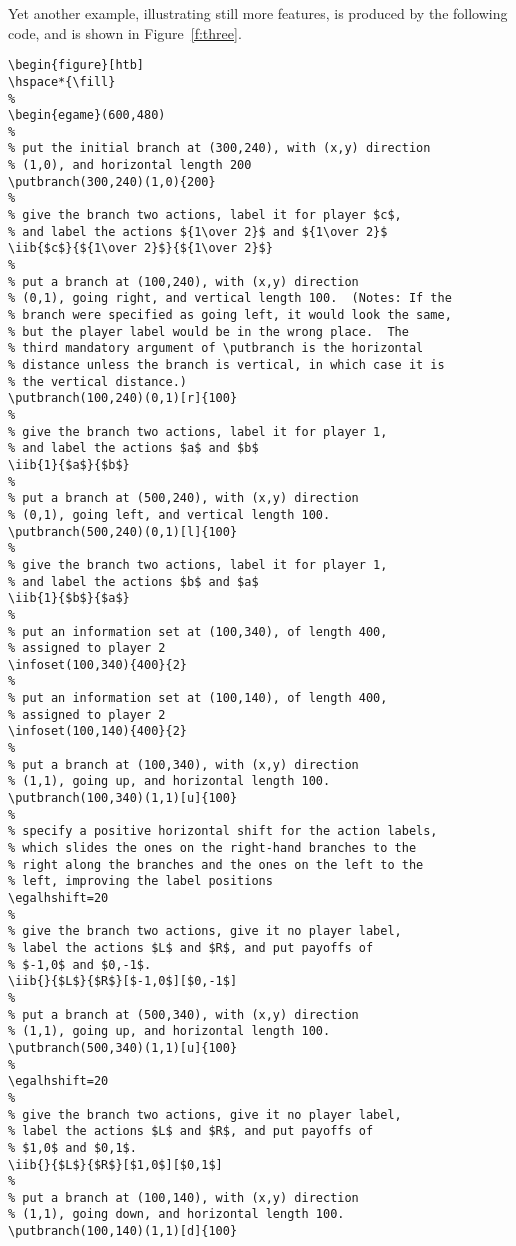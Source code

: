 \documentclass[12pt]{article}
\begin{document}
Yet another example, illustrating still more features, is produced by the
following code, and is shown in Figure~\ref{f:three}.

\begin{verbatim}
\begin{figure}[htb]
\hspace*{\fill}
%
\begin{egame}(600,480)
%
% put the initial branch at (300,240), with (x,y) direction
% (1,0), and horizontal length 200
\putbranch(300,240)(1,0){200}
%
% give the branch two actions, label it for player $c$,
% and label the actions ${1\over 2}$ and ${1\over 2}$
\iib{$c$}{${1\over 2}$}{${1\over 2}$}
%
% put a branch at (100,240), with (x,y) direction
% (0,1), going right, and vertical length 100.  (Notes: If the
% branch were specified as going left, it would look the same,
% but the player label would be in the wrong place.  The
% third mandatory argument of \putbranch is the horizontal
% distance unless the branch is vertical, in which case it is
% the vertical distance.)
\putbranch(100,240)(0,1)[r]{100}
%
% give the branch two actions, label it for player 1,
% and label the actions $a$ and $b$
\iib{1}{$a$}{$b$}
%
% put a branch at (500,240), with (x,y) direction
% (0,1), going left, and vertical length 100.
\putbranch(500,240)(0,1)[l]{100}
%
% give the branch two actions, label it for player 1,
% and label the actions $b$ and $a$
\iib{1}{$b$}{$a$}
%
% put an information set at (100,340), of length 400,
% assigned to player 2
\infoset(100,340){400}{2}
%
% put an information set at (100,140), of length 400,
% assigned to player 2
\infoset(100,140){400}{2}
%
% put a branch at (100,340), with (x,y) direction
% (1,1), going up, and horizontal length 100.
\putbranch(100,340)(1,1)[u]{100}
%
% specify a positive horizontal shift for the action labels,
% which slides the ones on the right-hand branches to the
% right along the branches and the ones on the left to the
% left, improving the label positions
\egalhshift=20
%
% give the branch two actions, give it no player label,
% label the actions $L$ and $R$, and put payoffs of
% $-1,0$ and $0,-1$.
\iib{}{$L$}{$R$}[$-1,0$][$0,-1$]
%
% put a branch at (500,340), with (x,y) direction
% (1,1), going up, and horizontal length 100.
\putbranch(500,340)(1,1)[u]{100}
%
\egalhshift=20
%
% give the branch two actions, give it no player label,
% label the actions $L$ and $R$, and put payoffs of
% $1,0$ and $0,1$.
\iib{}{$L$}{$R$}[$1,0$][$0,1$]
%
% put a branch at (100,140), with (x,y) direction
% (1,1), going down, and horizontal length 100.
\putbranch(100,140)(1,1)[d]{100}

\end{verbatim}
\end{document}
